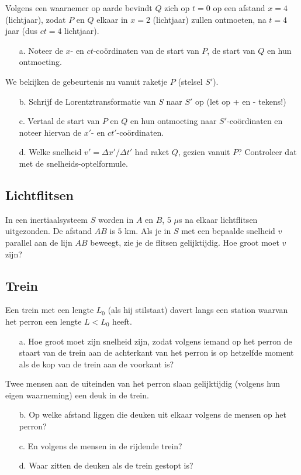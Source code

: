 Volgens  een waarnemer op aarde bevindt $Q$ zich op $t = 0$ op een afstand
$x = 4$ (lichtjaar), zodat $P$ 
en $Q$ elkaar in $x = 2$ (lichtjaar) zullen ontmoeten, na $t = 4$ jaar 
(dus $ct = 4$ lichtjaar). 
\begin{itemize}
\item [a.]
  Noteer  de  $x$-  en $ct$-co\"{o}rdinaten van de start van $P$,
de start van $Q$ en 
hun ontmoeting.
\end{itemize} 
We bekijken de gebeurtenis nu vanuit raketje $P$ (stelsel $S'$).
\begin{itemize}
\item [b.]
  Schrijf de Lorentztransformatie van $S$ naar $S'$ op (let op + en - tekens!)
\item [c.] 
  Vertaal  de  start  van $P$ en $Q$ en hun ontmoeting naar 
$S'$-co\"{o}rdinaten en noteer hiervan de $x'$- en $ct'$-co\"{o}rdinaten.
\item [d.]
  Welke  snelheid  $v' = \Delta x'/\Delta t'$ had raket $Q$, 
gezien vanuit $P$? 
Controleer dat met de snelheids-optelformule.
\end{itemize} 

\subsection{Lichtflitsen}
In een inertiaalsysteem $S$ worden in $A$ en $B$, $5$ $\mu$s na elkaar lichtflitsen uitgezonden.
De afstand $AB$ is $5$ km.
Als je in $S$ met een bepaalde snelheid $v$ parallel aan de lijn $AB$ beweegt, 
zie je de flitsen gelijktijdig.
Hoe groot moet $v$ zijn?


\subsection{Trein}
Een trein met een lengte $L_{0}$ (als hij stilstaat) davert langs een station
waarvan het perron een lengte $L < L_{0}$ heeft.
\begin{itemize}
\item [a.]
Hoe groot moet zijn snelheid zijn, zodat volgens iemand op het perron de staart
van de trein aan de achterkant van het perron is op hetzelfde moment als de kop van de trein aan de voorkant is?
\end{itemize}
Twee mensen aan de uiteinden van het perron slaan gelijktijdig 
(volgens hun eigen waarneming) een deuk in de trein.
\begin{itemize}
\item [b.]
Op welke afstand liggen die deuken uit elkaar volgens de mensen op het perron?
\item [c.]
En volgens de mensen in de rijdende trein?
\item [d.]
Waar zitten de deuken als de trein gestopt is?
\end{itemize}


